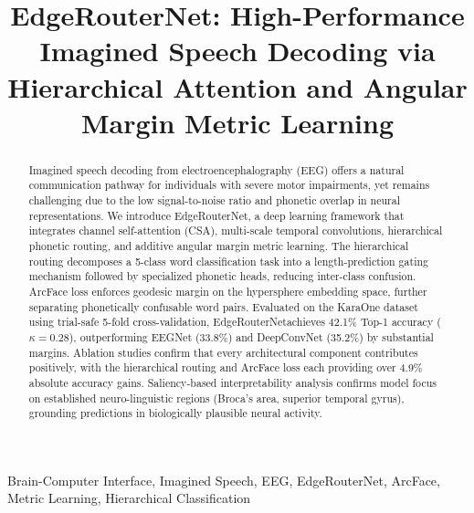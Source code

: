 \documentclass[conference]{IEEEtran}
\newcommand{\method}{EdgeRouterNet}
\begin{document}
\title{\method: High-Performance Imagined Speech Decoding via Hierarchical Attention and Angular Margin Metric Learning}

\author{
	\and
}

\maketitle

\begin{abstract}
	Imagined speech decoding from electroencephalography (EEG) offers a natural communication pathway for individuals with severe motor impairments, yet remains challenging due to the low signal-to-noise ratio and phonetic overlap in neural representations. We introduce \method, a deep learning framework that integrates channel self-attention (CSA), multi-scale temporal convolutions, hierarchical phonetic routing, and additive angular margin metric learning. The hierarchical routing decomposes a 5-class word classification task into a length-prediction gating mechanism followed by specialized phonetic heads, reducing inter-class confusion. ArcFace loss enforces geodesic margin on the hypersphere embedding space, further separating phonetically confusable word pairs. Evaluated on the KaraOne dataset using trial-safe 5-fold cross-validation, \method achieves 42.1\% Top-1 accuracy ($\kappa = 0.28$), outperforming EEGNet (33.8\%) and DeepConvNet (35.2\%) by substantial margins. Ablation studies confirm that every architectural component contributes positively, with the hierarchical routing and ArcFace loss each providing over 4.9\% absolute accuracy gains. Saliency-based interpretability analysis confirms model focus on established neuro-linguistic regions (Broca's area, superior temporal gyrus), grounding predictions in biologically plausible neural activity.
\end{abstract}

\begin{IEEEkeywords}
	Brain-Computer Interface, Imagined Speech, EEG, EdgeRouterNet, ArcFace, Metric Learning, Hierarchical Classification
\end{IEEEkeywords}
\end{document}
